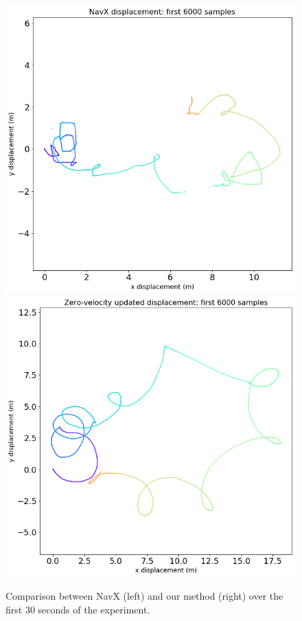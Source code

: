 \documentclass{article}
\begin{document}
		\begin{figure}[H]
			\centering
			\includegraphics[width=0.49\linewidth]{./images/navx-displacement-30s.png}
			\includegraphics[width=0.49\linewidth]{./images/zero-displacement-30s.png}
			\caption{Comparison between NavX (left) and our method (right) over the first 30 seconds of the experiment.}
			\label{fig:displacement_comparison_30s}
		\end{figure}
\end{document}
